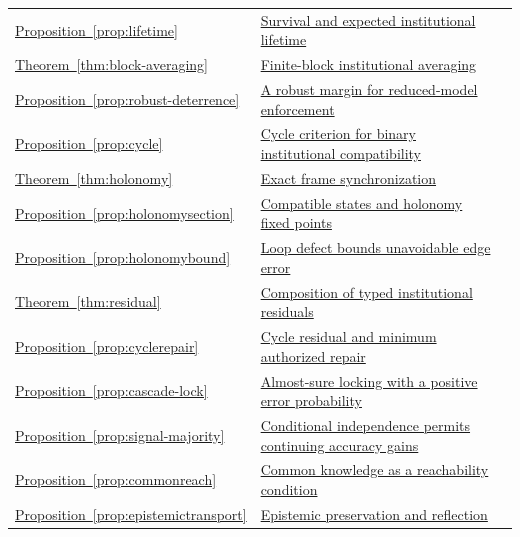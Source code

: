 \begin{longtable}{@{}P{.19\linewidth}P{.69\linewidth}r@{}}
\hyperref[prop:lifetime]{Proposition~\ref*{prop:lifetime}} & \hyperref[prop:lifetime]{Survival and expected institutional lifetime} & \pageref{prop:lifetime}\\
\hyperref[thm:block-averaging]{Theorem~\ref*{thm:block-averaging}} & \hyperref[thm:block-averaging]{Finite-block institutional averaging} & \pageref{thm:block-averaging}\\
\hyperref[prop:robust-deterrence]{Proposition~\ref*{prop:robust-deterrence}} & \hyperref[prop:robust-deterrence]{A robust margin for reduced-model enforcement} & \pageref{prop:robust-deterrence}\\
\hyperref[prop:cycle]{Proposition~\ref*{prop:cycle}} & \hyperref[prop:cycle]{Cycle criterion for binary institutional compatibility} & \pageref{prop:cycle}\\
\hyperref[thm:holonomy]{Theorem~\ref*{thm:holonomy}} & \hyperref[thm:holonomy]{Exact frame synchronization} & \pageref{thm:holonomy}\\
\hyperref[prop:holonomysection]{Proposition~\ref*{prop:holonomysection}} & \hyperref[prop:holonomysection]{Compatible states and holonomy fixed points} & \pageref{prop:holonomysection}\\
\hyperref[prop:holonomybound]{Proposition~\ref*{prop:holonomybound}} & \hyperref[prop:holonomybound]{Loop defect bounds unavoidable edge error} & \pageref{prop:holonomybound}\\
\hyperref[thm:residual]{Theorem~\ref*{thm:residual}} & \hyperref[thm:residual]{Composition of typed institutional residuals} & \pageref{thm:residual}\\
\hyperref[prop:cyclerepair]{Proposition~\ref*{prop:cyclerepair}} & \hyperref[prop:cyclerepair]{Cycle residual and minimum authorized repair} & \pageref{prop:cyclerepair}\\
\hyperref[prop:cascade-lock]{Proposition~\ref*{prop:cascade-lock}} & \hyperref[prop:cascade-lock]{Almost-sure locking with a positive error probability} & \pageref{prop:cascade-lock}\\
\hyperref[prop:signal-majority]{Proposition~\ref*{prop:signal-majority}} & \hyperref[prop:signal-majority]{Conditional independence permits continuing accuracy gains} & \pageref{prop:signal-majority}\\
\hyperref[prop:commonreach]{Proposition~\ref*{prop:commonreach}} & \hyperref[prop:commonreach]{Common knowledge as a reachability condition} & \pageref{prop:commonreach}\\
\hyperref[prop:epistemictransport]{Proposition~\ref*{prop:epistemictransport}} & \hyperref[prop:epistemictransport]{Epistemic preservation and reflection} & \pageref{prop:epistemictransport}\\

\end{longtable}
